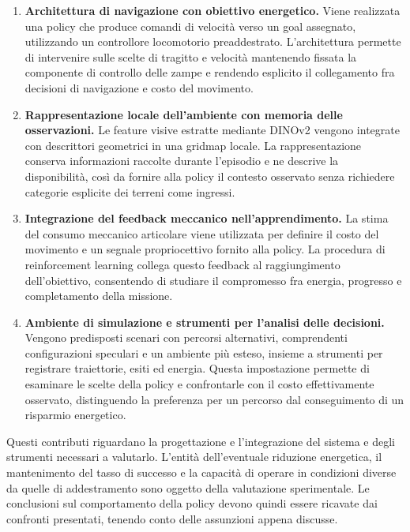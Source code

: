 \begin{enumerate}
    \item \textbf{Architettura di navigazione con obiettivo energetico.}
    Viene realizzata una policy che produce comandi di velocità verso un goal assegnato, utilizzando un controllore locomotorio preaddestrato. L'architettura permette di intervenire sulle scelte di tragitto e velocità mantenendo fissata la componente di controllo delle zampe e rendendo esplicito il collegamento fra decisioni di navigazione e costo del movimento.

    \item \textbf{Rappresentazione locale dell'ambiente con memoria delle osservazioni.}
    Le feature visive estratte mediante DINOv2 vengono integrate con descrittori geometrici in una gridmap locale. La rappresentazione conserva informazioni raccolte durante l'episodio e ne descrive la disponibilità, così da fornire alla policy il contesto osservato senza richiedere categorie esplicite dei terreni come ingressi.

    \item \textbf{Integrazione del feedback meccanico nell'apprendimento.}
    La stima del consumo meccanico  articolare viene utilizzata per definire il costo del movimento e un segnale propriocettivo fornito alla policy. La procedura di reinforcement learning collega questo feedback al raggiungimento dell'obiettivo, consentendo di studiare il compromesso fra energia, progresso e completamento della missione.

    \item \textbf{Ambiente di simulazione e strumenti per l'analisi delle decisioni.}
    Vengono predisposti scenari con percorsi alternativi, comprendenti configurazioni speculari e un ambiente più esteso, insieme a strumenti per registrare traiettorie, esiti ed energia. Questa impostazione permette di esaminare le scelte della policy e confrontarle con il costo effettivamente osservato, distinguendo la preferenza per un percorso dal conseguimento di un risparmio energetico.
\end{enumerate}

Questi contributi riguardano la progettazione e l'integrazione del sistema e degli strumenti necessari a valutarlo. L'entità dell'eventuale riduzione energetica, il mantenimento del tasso di successo e la capacità di operare in condizioni diverse da quelle di addestramento sono oggetto della valutazione sperimentale. Le conclusioni sul comportamento della policy devono quindi essere ricavate dai confronti presentati, tenendo conto delle assunzioni appena discusse.

